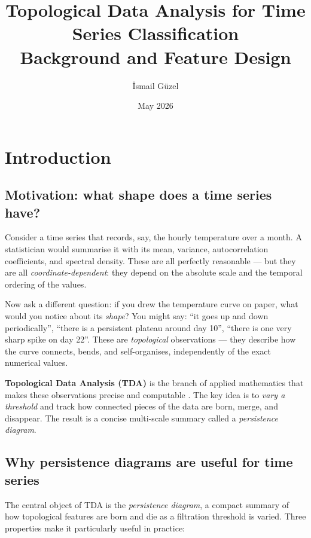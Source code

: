 \documentclass[12pt, a4paper]{article}
\title{%
  \textbf{Topological Data Analysis for Time Series Classification}\\[0.5em]
  \large Background and Feature Design
}
\author{İsmail Güzel}
\date{May 2026}
\theoremstyle{definition}
\theoremstyle{plain}
\begin{document}
\maketitle
\tableofcontents
\newpage

\section{Introduction}

\subsection*{Motivation: what shape does a time series have?}

Consider a time series that records, say, the hourly temperature over a month.
A statistician would summarise it with its mean, variance, autocorrelation
coefficients, and spectral density. These are all perfectly reasonable — but
they are all \emph{coordinate-dependent}: they depend on the absolute scale and
the temporal ordering of the values.

Now ask a different question: if you drew the temperature curve on paper, what
would you notice about its \emph{shape}? You might say: ``it goes up and down
periodically'', ``there is a persistent plateau around day 10'', ``there is one
very sharp spike on day 22''. These are \emph{topological} observations — they
describe how the curve connects, bends, and self-organises, independently of the
exact numerical values.

\textbf{Topological Data Analysis (TDA)} is the branch of applied mathematics
that makes these observations precise and computable
\citep{carlsson2009topology, edelsbrunner2010computational}.
The key idea is to \emph{vary a threshold} and track how connected pieces of the
data are born, merge, and disappear. The result is a concise multi-scale summary
called a \emph{persistence diagram}.

\subsection*{Why persistence diagrams are useful for time series}

The central object of TDA is the \emph{persistence diagram}, a compact summary of
how topological features are born and die as a filtration threshold is varied.
Three properties make it particularly useful in practice:
\end{document}
